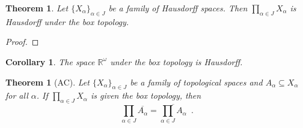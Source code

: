 \documentclass{report}
\let\qed\relax
\newtheorem{thm}[lm]{Theorem}
\newtheorem{cor}{Corollary}[lm]
\theoremstyle{definition}
\begin{document}
  \begin{thm}
    Let $\{ X_\alpha \}_{\alpha \in J}$ be a family of Hausdorff spaces. Then
    $\prod_{\alpha \in J} X_\alpha$ is Hausdorff under the box topology.
  \end{thm}

  \begin{proof}
    \pf
    \qed
  \end{proof}

  \begin{cor}
  	The space $\mathbb{R}^\omega$ under the box topology is Hausdorff.
  \end{cor}

  \begin{thm}[AC]
    Let $\{ X_\alpha \}_{\alpha \in J}$ be a family of topological spaces and
    $A_\alpha \subseteq X_\alpha$ for all $\alpha$. If $\prod_{\alpha \in J}
    X_\alpha$ is given the box topology, then
    \[ \prod_{\alpha \in J} \overline{A_\alpha} = \overline{\prod_{\alpha \in
        J}
      A_\alpha} \enspace . \]
  \end{thm}
\end{document}

